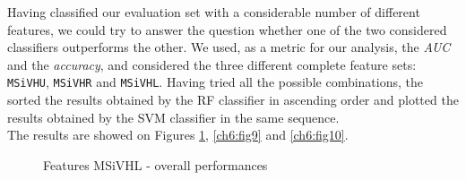 Having classified our evaluation set with a considerable number of different features, we could try to answer the question
whether one of the two considered classifiers outperforms the other. We used, as a metric for our analysis,
the \textit{AUC} and the \textit{accuracy}, and considered the three different complete feature sets: \texttt{MSiVHU}, \texttt{MSiVHR} and \texttt{MSiVHL}.
Having tried all the possible combinations, the sorted the results obtained by the \Gls{RF} classifier in ascending order and plotted the results obtained by the 
\Gls{SVM} classifier in the same sequence.\\
The results are showed on Figures \ref{ch6:fig8}, \ref{ch6:fig9} and \ref{ch6:fig10}.


\begin{figure}[!htb]
  \centering
    \hspace{1mm}
    \caption{Features MSiVHL - overall performances}
    \label{ch6:fig8}
\end{figure}

